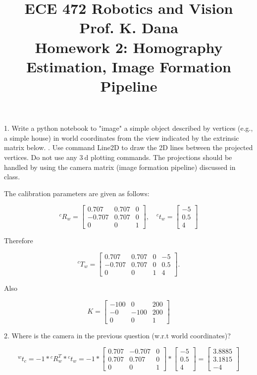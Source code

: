 \documentclass{article}
\begin{document}
\title{
ECE 472 Robotics and Vision \\ Prof. K. Dana \\ Homework 2: Homography Estimation, Image Formation Pipeline
}

1. Write a python notebook to "image" a simple object described by vertices (e.g., a simple house) in world coordinates from the view indicated by the extrinsic matrix below. . Use command Line2D to draw the 2D lines between the projected vertices. Do not use any $3 \mathrm{~d}$ plotting commands. The projections should be handled by using the camera matrix (image formation pipeline) discussed in class.

The calibration parameters are given as follows:

$$
{ }^{c} R_{w}=\left[\begin{array}{ccc}
0.707 & 0.707 & 0 \\
-0.707 & 0.707 & 0 \\
0 & 0 & 1
\end{array}\right], \quad{ }^{c} t_{w}=\left[\begin{array}{c}
-5 \\
0.5 \\
4
\end{array}\right]
$$

Therefore

$$
{ }^{c} T_{w}=\left[\begin{array}{cccc}
0.707 & 0.707 & 0 & -5 \\
-0.707 & 0.707 & 0 & 0.5 \\
0 & 0 & 1 & 4
\end{array}\right] .
$$

Also

$$
K=\left[\begin{array}{ccc}
-100 & 0 & 200 \\
-0 & -100 & 200 \\
0 & 0 & 1
\end{array}\right]
$$

2. Where is the camera in the previous question (w.r.t world coordinates)?

$$
{ }^{w} t_{c}=-1*{ }^{c} R_{w}^{T}*{ }^{c} t_{w} = -1*\left[\begin{array}{ccc}
0.707 & -0.707 & 0 \\
0.707 & 0.707 & 0 \\
0 & 0 & 1
\end{array}\right]*
\left[\begin{array}{c}
-5 \\
0.5 \\
4
\end{array}\right]=
\left[\begin{array}{c}
3.8885 \\
3.1815 \\
-4
\end{array}\right]
$$
\end{document}
